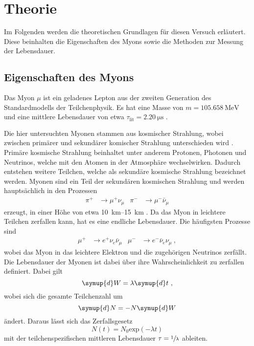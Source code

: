 \section{Theorie}
\label{sec:theorie}

Im Folgenden werden die theoretischen Grundlagen für diesen Versuch erläutert.
Diese beinhalten die Eigenschaften des Myons
sowie die Methoden zur Messung der Lebensdauer.


\subsection{Eigenschaften des Myons}

Das Myon $\mu$ ist ein geladenes Lepton aus der zweiten Generation des Standardmodells der Teilchenphysik.
Es hat eine Masse von $m = \SI{105.658}{\mega\eV}$ und eine mittlere Lebensdauer von etwa $\tau_\text{lit} = \SI{2.20}{\micro\second}$ \cite{pdg}.

Die hier untersuchten Myonen stammen aus kosmischer Strahlung,
wobei zwischen primärer und sekundärer komischer Strahlung unterschieden wird \cite{grupen}.
Primäre kosmische Strahlung beinhaltet unter anderem Protonen,
Photonen und Neutrinos,
welche mit den Atomen in der Atmosphäre wechselwirken.
Dadurch entstehen weitere Teilchen,
welche als sekundäre kosmische Strahlung bezeichnet werden.
Myonen sind ein Teil der sekundären kosmischen Strahlung und werden hauptsächlich in den Prozessen
\begin{align*}
    \pi^{+} &\to \mu^{+}     \nu_{\mu} &
    \pi^{-} &\to \mu^{-} \bar\nu_{\mu}
\end{align*}
erzeugt,
in einer Höhe von etwa \SIrange{10}{15}{\kilo\meter} \cite{grupen}.
Da das Myon in leichtere Teilchen zerfallen kann,
hat es eine endliche Lebensdauer.
Die häufigsten Prozesse sind
\begin{align*}
    \mu^{+} &\to e^{+}     \nu_{e} \bar\nu_{\mu} &
    \mu^{-} &\to e^{-} \bar\nu_{e}     \nu_{\mu} \ ,
\end{align*}
wobei das Myon in das leichtere Elektron und die zugehörigen Neutrinos zerfällt.
Die Lebensdauer der Myonen ist dabei über ihre Wahrscheinlichkeit zu zerfallen definiert.
Dabei gilt
\begin{equation*}
    \symup{d}W = \lambda \symup{d}t \ ,
\end{equation*}
wobei sich die gesamte Teilchenzahl um
\begin{equation*}
    \symup{d}N = -N \symup{d}W
\end{equation*}
ändert.
Daraus lässt sich das Zerfallsgesetz
\begin{equation*}
    N(t) = N_0 \text{exp}(- \lambda t)
\end{equation*}
mit der teilchenspezifischen mittleren Lebensdauer $\tau = \sfrac{1}{\lambda}$ ableiten.


